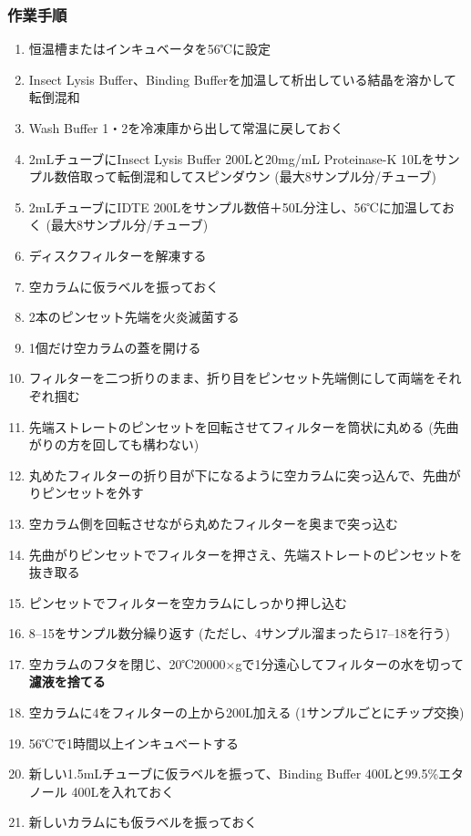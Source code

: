 \documentclass[titlepage,10pt,a4paper,uplatex]{jsbook}
\renewcommand{\textbf}[1]{{\bfseries\sffamily#1}}
\begin{document}
\subsubsection{作業手順}
\begin{enumerate}
\item 恒温槽またはインキュベータを56℃に設定
\item Insect Lysis Buffer、Binding Bufferを加温して析出している結晶を溶かして転倒混和
\item Wash Buffer 1・2を冷凍庫から出して常温に戻しておく
\item 2mLチューブにInsect Lysis Buffer 200{\textmu}Lと20mg/mL Proteinase-K 10{\textmu}Lをサンプル数倍取って転倒混和してスピンダウン (最大8サンプル分/チューブ)
\item 2mLチューブにIDTE 200{\textmu}Lをサンプル数倍＋50{\textmu}L分注し、56℃に加温しておく (最大8サンプル分/チューブ)
\item ディスクフィルターを解凍する
\item 空カラムに仮ラベルを振っておく
\item 2本のピンセット先端を火炎滅菌する
\item 1個だけ空カラムの蓋を開ける
\item フィルターを二つ折りのまま、折り目をピンセット先端側にして両端をそれぞれ掴む
\item 先端ストレートのピンセットを回転させてフィルターを筒状に丸める (先曲がりの方を回しても構わない)
\item 丸めたフィルターの折り目が下になるように空カラムに突っ込んで、先曲がりピンセットを外す
\item 空カラム側を回転させながら丸めたフィルターを奥まで突っ込む
\item 先曲がりピンセットでフィルターを押さえ、先端ストレートのピンセットを抜き取る
\item ピンセットでフィルターを空カラムにしっかり押し込む
\item 8--15をサンプル数分繰り返す (ただし、4サンプル溜まったら17--18を行う)
\item 空カラムのフタを閉じ、20℃20000×gで1分遠心してフィルターの水を切って\textbf{濾液を捨てる}
\item 空カラムに4をフィルターの上から200{\textmu}L加える (1サンプルごとにチップ交換)
\item 56℃で1時間以上インキュベートする
\item 新しい1.5mLチューブに仮ラベルを振って、Binding Buffer 400{\textmu}Lと99.5\%エタノール 400{\textmu}Lを入れておく
\item 新しいカラムにも仮ラベルを振っておく

\end{enumerate}
\end{document}
